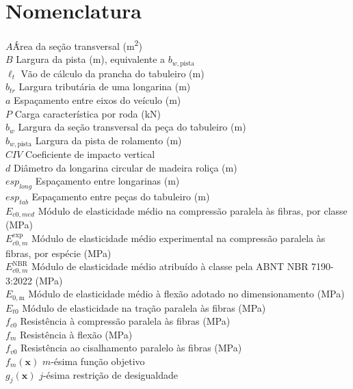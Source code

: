 \section*{Nomenclatura}

\begin{tabbing}
$A$\qquad\qquad \= Área da seção transversal (m\textsuperscript{2})\\
$B$ \> Largura da pista (m), equivalente a $b_{w,\mathrm{pista}}$\\
$\ell_t$ \> Vão de cálculo da prancha do tabuleiro (m)\\
$b_{tr}$ \> Largura tributária de uma longarina (m)\\
$a$ \> Espaçamento entre eixos do veículo (m)\\
$P$ \> Carga característica por roda (kN)\\
$b_w$ \> Largura da seção transversal da peça do tabuleiro (m)\\
$b_{w,\mathrm{pista}}$ \> Largura da pista de rolamento (m)\\
$CIV$ \> Coeficiente de impacto vertical\\
$d$ \> Diâmetro da longarina circular de madeira roliça (m)\\
$esp_{long}$ \> Espaçamento entre longarinas (m)\\
$esp_{tab}$ \> Espaçamento entre peças do tabuleiro (m)\\
$E_{c0,med}$ \> Módulo de elasticidade médio na compressão paralela às fibras, por classe (MPa)\\
$E_{c0,m}^{\mathrm{exp}}$ \> Módulo de elasticidade médio experimental na compressão paralela às fibras, por espécie (MPa)\\
$E_{c0,m}^{\mathrm{NBR}}$ \> Módulo de elasticidade médio atribuído à classe pela ABNT NBR 7190-3:2022 (MPa)\\
$E_{0,\mathrm{m}}$ \> Módulo de elasticidade médio à flexão adotado no dimensionamento (MPa)\\
$E_{t0}$ \> Módulo de elasticidade na tração paralela às fibras (MPa)\\
$f_{c0}$ \> Resistência à compressão paralela às fibras (MPa)\\
$f_{m}$ \> Resistência à flexão (MPa)\\
$f_{v0}$ \> Resistência ao cisalhamento paralelo às fibras (MPa)\\
$f_m(\mathbf{x})$ \> $m$-ésima função objetivo\\
$g_j(\mathbf{x})$ \> $j$-ésima restrição de desigualdade\\

\end{tabbing}
